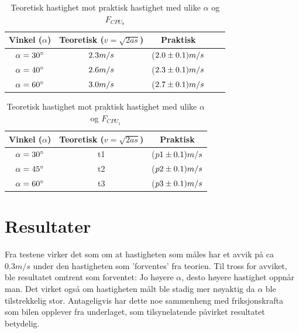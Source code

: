 \documentclass[11pt, a4paper]{article}
\begin{document}
\begin{table}[h]
\caption{Teoretisk hastighet mot praktisk hastighet med ulike $\alpha$ og $F_{CPU_{8}}$}
\begin{center}
\begin{tabular}{ccccc}
\hline
Vinkel ($\alpha$)  & Teoretisk ($ v =\sqrt{2as}$) &  Praktisk\\
\hline

$\alpha = 30^{\circ}\rm$ & $2.3 m/s\rm$ & ($2.0 \pm 0.1) m/s \rm$\\

$\alpha = 40^{\circ}\rm$ & $2.6 m/s\rm $& ($2.3 \pm 0.1) m/s \rm $ \\

$\alpha = 60^{\circ}\rm$ & $3.0 m/s\rm $& ($2.7\pm 0.1) m/s \rm $ \\

\hline

\end{tabular}
\end{center}
\end{table}


\begin{table}[h]
\caption{Teoretisk hastighet mot praktisk hastighet med ulike $\alpha$ og $F_{CPU_{1}}$}
\begin{center}
\begin{tabular}{ccc}
\hline
Vinkel ($\alpha$)  & Teoretisk ($ v =\sqrt{2as}$) &  Praktisk\\
\hline

$\alpha = 30^{\circ}\rm$ & t1 & ($p1 \pm 0.1) m/s \rm$\\

$\alpha = 45^{\circ}\rm$ & t2 & ($p2 \pm 0.1) m/s \rm $ \\

$\alpha = 60^{\circ}\rm$ & t3 & ($p3 \pm 0.1) m/s \rm $ \\

\hline
\end{tabular}
\end{center}
\end{table}


\section{Resultater}

Fra testene virker det som om at hastigheten som måles har et avvik på ca $0.3 m/s$ under den hastigheten som 'forventes' fra teorien. Til tross for avviket, ble resultatet omtrent som forventet: Jo høyere $\alpha$, desto høyere hastighet oppnår man. Det virket også om hastigheten målt ble stadig mer nøyaktig da $\alpha$ ble tilstrekkelig stor. Antageligvis har dette noe sammenheng med friksjonskrafta som bilen opplever fra underlaget, som tilsynelatende påvirket resultatet betydelig.
 
\end{document}
